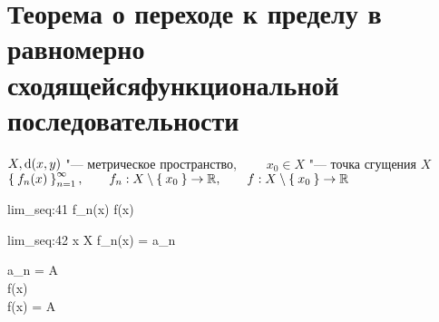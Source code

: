 \section{Теорема о переходе к пределу в равномерно сходящейся\n функциональной последовательности}

\begin{theorem}
	$ X, \operatorname{d}(x, y) $ "--- метрическое пространство, $ \qquad x_0 \in X $ "--- точка сгущения $ X $ \\
	$ \Set{f_n(x)}_{n=1}^{\infty}, \qquad f_n : X \setminus \Set{x_0} \to \mathbb{R}, \qquad f : X \setminus \Set{x_0} \to \mathbb{R} $
	\begin{equ}{lim_seq:41}
		f_n(x)  f(x)
	\end{equ}
	\begin{equ}{lim_seq:42}
		\forall x \in X \setminus {} \quad \exist {} f_n(x) = a_n
	\end{equ}
	\begin{mequ}[\implies \empheqlbrace]
		 \exist {} a_n = A \in \R \\
		 \exist {} f(x) \\
		  f(x) = A
	\end{mequ}
\end{theorem}

